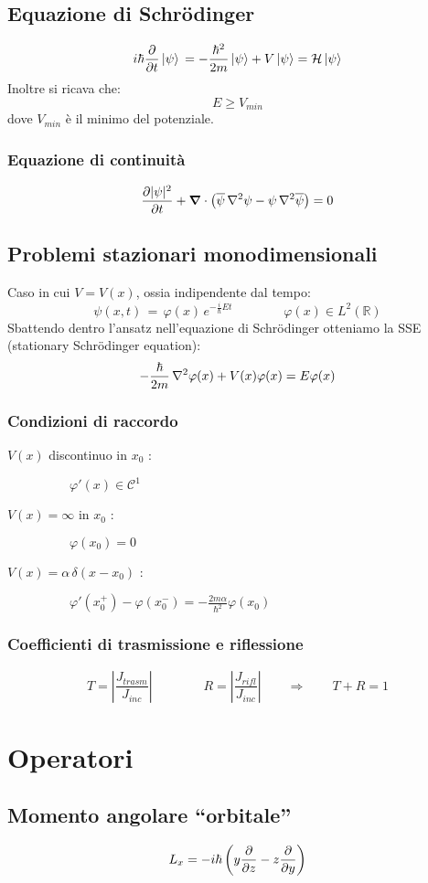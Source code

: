 \subsection{Equazione di Schr\"{o}dinger}
$$ 
  i\hbar \frac{ \partial }{ \partial t}\left| \psi \right> \, = -\frac{\hbar^2}{2m}\left| \psi \right> + V \left| \psi \right>  = \mathcal{H} \left| \psi \right>
$$
Inoltre si ricava che:
$$
E \geq V_{min}
$$
dove $V_{min}$ è il minimo del potenziale.
\subsubsection{Equazione di continuità}
$$
\frac{\partial | \psi|^2}{\partial t} + \mbox{\boldmath$ \nabla $} \cdot \left( \overline{\psi} \, \nabla^2\psi - \psi \, \nabla^2\overline{\psi} \right) = 0
$$
\subsection{Problemi stazionari monodimensionali}
Caso in cui $ V= V(x)$, ossia indipendente dal tempo:
$$	\psi(x,t) \, = \, \varphi(x) \, e^{ -\frac{i}{\hbar} E t } \qquad \qquad \varphi(x) \in L^2(\mathbb{R}) 
$$	 
Sbattendo dentro l'ansatz nell'equazione di Schr\"{o}dinger otteniamo la SSE (stationary Schr\"{o}dinger equation):
$$
-\frac{\hbar}{2m} \, \nabla^2 \varphi(x) + V(x) \varphi(x) = E \varphi(x)
$$ 
\subsubsection{Condizioni di raccordo}
\begin{description}
 \item[$V(x)$ discontinuo in $x_0$ : ] $\qquad \varphi ' (x) \in \mathcal{C}^1 $
  \item[$V(x) = \infty$ in $x_0$ : ] $	\qquad \varphi(x_0) = 0 $
 \item[$V(x) = \alpha \, \delta (x-x_0)$ : ] $\qquad \varphi'(x_{0}^{+}) - \varphi(x_{0}^{-}) = -\frac{2 m \alpha}{\hbar^2} \varphi(x_0)$
\end{description}
\subsubsection{Coefficienti di trasmissione e riflessione}
$$
T = \left| \frac{J_{trasm}}{J_{inc}}\right|  \qquad \qquad R = \left| \frac{J_{rifl}}{J_{inc}} \right| \qquad \Longrightarrow \qquad T + R = 1 
$$ 


\section{Operatori}
\subsection{Momento angolare ``orbitale''}
$$
L_x = -i\hbar \left(y {\partial\over \partial z} - z {\partial\over \partial y}\right)
$$

